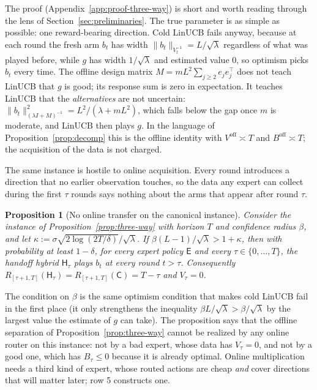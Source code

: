 \documentclass{article}
\newtheorem{proposition}{Proposition}
\theoremstyle{definition}
\theoremstyle{remark}
\theoremstyle{remark}
\newcommand{\Cold}{\mathsf{C}}
\newcommand{\Exp}{\mathsf{E}}
\newcommand{\Hyb}{\mathsf{H}}
\begin{document}
The proof (Appendix~\ref{app:proof-three-way}) is short and worth reading
through the lens of Section~\ref{sec:preliminaries}. The true parameter is as
simple as possible: one reward-bearing direction. Cold LinUCB fails anyway,
because at each round the fresh arm $b_t$ has width $\|b_t\|_{V_t^{-1}}=L/\sqrt\lambda$
regardless of what was played before, while $g$ has width $1/\sqrt\lambda$ and
estimated value $0$, so optimism picks $b_t$ every time. The offline design
matrix $M=mL^2\sum_{j\ge2}e_je_j^\top$ does not teach LinUCB that $g$ is good;
its response sum is zero in expectation. It teaches LinUCB that the
\emph{alternatives} are not uncertain: $\|b_t\|^2_{(\lambda I+M)^{-1}}=L^2/(\lambda+mL^2)$,
which falls below the gap once $m$ is moderate, and LinUCB then plays $g$.
In the language of Proposition~\ref{prop:decomp} this is the offline identity with
$V^{\mathrm{off}}\asymp T$ and $B^{\mathrm{off}}\asymp T$; the acquisition of
the data is not charged.

The same instance is hostile to online acquisition. Every round introduces a
direction that no earlier observation touches, so the data any expert can
collect during the first $\tau$ rounds says nothing about the arms that appear
after round $\tau$.

\begin{proposition}[No online transfer on the canonical instance]
\label{prop:one-pass}
Consider the instance of Proposition~\ref{prop:three-way} with horizon $T$
and confidence radius $\beta$, and let $\kappa:=\sigma\sqrt{2\log(2T/\delta)}/\sqrt\lambda$.
If $\beta(L-1)/\sqrt\lambda>1+\kappa$, then with probability at least
$1-\delta$, for \emph{every} expert policy $\Exp$ and every $\tau\in\{0,\dots,T\}$,
the handoff hybrid $\Hyb_\tau$ plays $b_t$ at every round $t>\tau$. Consequently
$R_{[\tau+1,T]}(\Hyb_\tau)=R_{[\tau+1,T]}(\Cold)=T-\tau$ and $V_\tau=0$.
\end{proposition}

The condition on $\beta$ is the same optimism condition that makes cold LinUCB
fail in the first place (it only strengthens the inequality
$\beta L/\sqrt\lambda>\beta/\sqrt\lambda$ by the largest value the estimate of
$g$ can take). The proposition says that the offline separation of
Proposition~\ref{prop:three-way} cannot be realized by any online router on
this instance: not by a bad expert, whose data has $V_\tau=0$, and not by a
good one, which has $B_\tau\le0$ because it is already optimal. Online
multiplication needs a third kind of expert, whose routed actions are cheap
\emph{and} cover directions that will matter later; row 5 constructs one.
\end{document}
